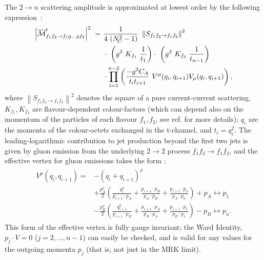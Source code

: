 The
$2\to n$ scattering amplitude is approximated at lowest order by the following
expression~\cite{Andersen:2011hs}:
\begin{align}
  \label{eq:multijetVs}
  \begin{split}
    \left|\overline{\mathcal{M}}^t_{f_1 f_2\to f_1g\ldots gf_2}\right|^2\ =\ &\frac 1 {4\
      (\Nc^2-1)}\ \left\|S_{f_1f_2\to f_1f_2}\right\|^2\\
    &\cdot\ \left(g^2\ K_{f_1}\ \frac 1 {t_1}\right) \cdot\ \left(g^2\ K_{f_2}\ \frac 1
      {t_{n-1}}\right)\\
    & \cdot \prod_{i=1}^{n-2} \left( \frac{-g^2 C_A}{t_it_{i+1}}\
      V^\mu(q_i,q_{i+1})V_\mu(q_i,q_{i+1}) \right),
  \end{split}
\end{align}
where $\left\|S_{f_1 f_2\to f_1 f_2}\right\|^2$ denotes the square of a pure
current-current scattering, $K_{f_1}, K_{f_2}$ are flavour-dependent
colour-factors (which can depend also on the momentum of the particles of
each flavour $f_1, f_2$, see ref.\@ \cite{Andersen:2011hs} for more
details); $q_i$ are the momenta of the colour-octets exchanged in the t-channel, and $t_i=q_i^2$.  The leading-logarithmic contribution to jet production beyond the
first two jets is given by
gluon emission from the underlying $2\to2$ process $f_1 f_2\to f_1 f_2$, and the effective vertex for gluon emissions takes the form \cite{Andersen:2009nu}:
\begin{align}
  \label{eq:GenEmissionV}
  \begin{split}
  V^\rho(q_i,q_{i+1})=&-(q_i+q_{i+1})^\rho \\
  &+ \frac{p_A^\rho}{2} \left( \frac{q_i^2}{p_{i+1}\cdot p_A} +
  \frac{p_{i+1}\cdot p_B}{p_A\cdot p_B} + \frac{p_{i+1}\cdot p_n}{p_A\cdot p_n}\right) +
p_A \leftrightarrow p_1 \\ 
  &- \frac{p_B^\rho}{2} \left( \frac{q_{i+1}^2}{p_{i+1} \cdot p_B} + \frac{p_{i+1}\cdot
      p_A}{p_B\cdot p_A} + \frac{p_{i+1}\cdot p_1}{p_B\cdot p_1} \right) - p_B
  \leftrightarrow p_n.
  \end{split}
\end{align}
This form of the effective vertex is fully gauge invariant; the Ward
Identity, $p_j\cdot V=0$ ($j=2,...,n-1$) can easily be checked, and is
valid for any values for the outgoing momenta $p_j$ (that is, not just in the MRK limit).

